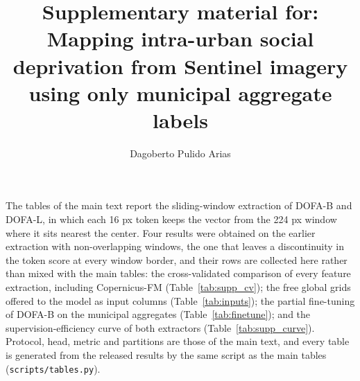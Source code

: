 \documentclass[11pt]{article}
\title{\textbf{Supplementary material for: Mapping intra-urban social deprivation from
Sentinel imagery using only municipal aggregate labels}}
\author[1]{Dagoberto Pulido Arias}
\affil[1]{Independent researcher, Mexico. Correspondence: dagopa.1010@gmail.com}
\date{}
\begin{document}
\maketitle

The tables of the main text report the sliding-window extraction of DOFA-B and DOFA-L,
in which each 16 px token keeps the vector from the 224 px window where it sits nearest
the center. Four results were obtained on the earlier extraction with non-overlapping
windows, the one that leaves a discontinuity in the token score at every window border,
and their rows are collected here rather than mixed with the main tables: the
cross-validated comparison of every feature extraction, including Copernicus-FM
(Table~\ref{tab:supp_cv}); the free global grids offered to the model as input columns
(Table~\ref{tab:inputs}); the partial fine-tuning of DOFA-B on the municipal
aggregates (Table~\ref{tab:finetune}); and the supervision-efficiency curve of both
extractors (Table~\ref{tab:supp_curve}). Protocol, head, metric and partitions are those
of the main text, and every table is generated from the released results by the same
script as the main tables (\texttt{scripts/tables.py}).








\end{document}
